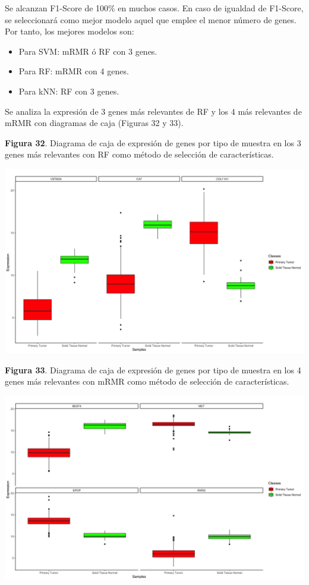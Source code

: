 Se alcanzan F1-Score de 100\% en muchos casos. En caso de igualdad de F1-Score, se seleccionará como mejor modelo aquel que emplee el menor número de genes. Por tanto, los mejores modelos son:
\begin{itemize}
	\item Para SVM: mRMR ó RF con 3 genes.
	\item Para RF: mRMR con 4 genes.
	\item Para kNN: RF con 3 genes.
\end{itemize}

Se analiza la expresión de 3 genes más relevantes de RF y los 4 más relevantes de mRMR con diagramas de caja (Figuras 32 y 33).

\newpage
\begin{center}
\textbf{Figura 32}. Diagrama de caja de expresión de genes por tipo de muestra en los 3 genes más relevantes con RF como método de selección de características.
\end{center}
\begin{center}
	\includegraphics[width=1\textwidth]{figuras/32_cr_biclase_43_knn_boxplots_mejor_metodo.png} 
\end{center}

\begin{center}
\textbf{Figura 33}. Diagrama de caja de expresión de genes por tipo de muestra en los 4 genes más relevantes con mRMR como método de selección de características.
\end{center}
\begin{center}
	\includegraphics[width=1\textwidth]{figuras/33_cr_biclase_30_rf_boxplots_mejor_metodo.png} 
\end{center}

